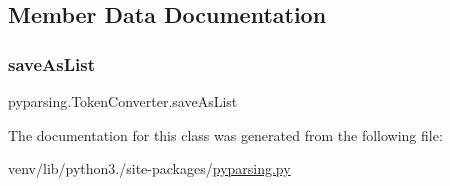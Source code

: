 \subsection{Member Data Documentation}
\mbox{\label{classpyparsing_1_1TokenConverter_a6aa78576e71aa67cd5638792ced778c1}} 
\subsubsection{\texorpdfstring{save\+As\+List}{saveAsList}}
{\footnotesize\ttfamily pyparsing.\+Token\+Converter.\+save\+As\+List}



The documentation for this class was generated from the following file\+:\begin{DoxyCompactItemize}
\item 
venv/lib/python3./site-\/packages/\hyperlink{pyparsing_8py}{pyparsing.\+py}\end{DoxyCompactItemize}
